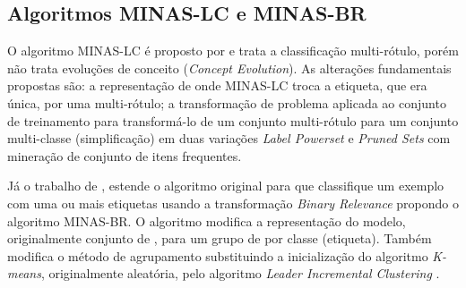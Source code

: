 \subsection{Algoritmos MINAS-LC e MINAS-BR}

O algoritmo MINAS-LC é proposto por  e trata a classificação
multi-rótulo, porém não trata evoluções de conceito (\emph{Concept Evolution}).
As alterações fundamentais propostas são:
a representação de \cluster onde MINAS-LC troca a etiqueta, que era única, por uma multi-rótulo;
a transformação de problema aplicada ao conjunto de treinamento para transformá-lo de um
conjunto multi-rótulo para um conjunto multi-classe (simplificação)
em duas variações \emph{Label Powerset} e \emph{Pruned Sets} com
mineração de conjunto de itens frequentes.


Já o trabalho de , estende o algoritmo original para que
classifique um exemplo com uma ou mais etiquetas usando a transformação
\emph{Binary Relevance} propondo o algoritmo MINAS-BR.
O algoritmo modifica a representação do modelo, originalmente conjunto de \clusters, para
um grupo de \clusters por classe (etiqueta).
Também modifica o método de agrupamento substituindo a inicialização do 
algoritmo \emph{K-means}, originalmente aleatória, pelo algoritmo 
\emph{Leader Incremental Clustering} \cite{Vijaya2004505}.

